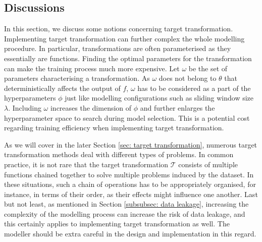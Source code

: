 \subsection{Discussions}
In this section, we discuss some notions concerning target transformation. Implementing target transformation can further complex the whole modelling procedure. In particular, transformations are often parameterised as they essentially are functions. Finding the optimal parameters for the transformation can make the training process much more expensive. Let $\omega$ be the set of parameters characterising a transformation. As $\omega$ does not belong to $\theta$ that deterministically affects the output of $f$, $\omega$ has to be considered as a part of the hyperparameters $\phi$ just like modelling configurations such as sliding window size $\lambda$. Including $\omega$ increases the dimension of $\phi$ and further enlarges the hyperparameter space to search during model selection. This is a potential cost regarding training efficiency when implementing target transformation.

As we will cover in the later Section \ref{sec: target transformation}, numerous target transformation methods deal with different types of problems. In common practice, it is not rare that the target transformation $\mathcal{T}$ consists of multiple functions chained together to solve multiple problems induced by the dataset. In these situations, such a chain of operations has to be appropriately organised, for instance, in terms of their order, as their effects might influence one another. Last but not least, as mentioned in Section \ref{subsubsec: data leakage}, increasing the complexity of the modelling process can increase the risk of data leakage, and this certainly applies to implementing target transformation as well. The modeller should be extra careful in the design and implementation in this regard.
